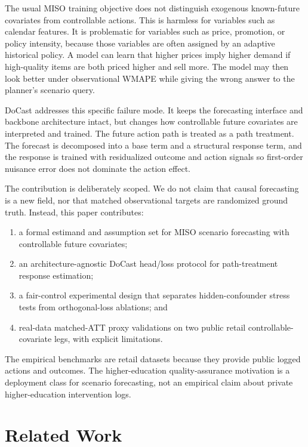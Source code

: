 \documentclass[11pt]{article}
\begin{document}
The usual MISO training objective does not distinguish exogenous known-future
covariates from controllable actions. This is harmless for variables such as
calendar features. It is problematic for variables such as price, promotion, or
policy intensity, because those variables are often assigned by an adaptive
historical policy. A model can learn that higher prices imply higher demand if
high-quality items are both priced higher and sell more. The model may then
look better under observational WMAPE while giving the wrong answer to the
planner's scenario query.

DoCast addresses this specific failure mode. It keeps the forecasting interface
and backbone architecture intact, but changes how controllable future
covariates are interpreted and trained. The future action path is treated as a
path treatment. The forecast is decomposed into a base term and a structural
response term, and the response is trained with residualized outcome and action
signals so first-order nuisance error does not dominate the action effect.

The contribution is deliberately scoped. We do not claim that causal
forecasting is a new field, nor that matched observational targets are
randomized ground truth. Instead, this paper contributes:
\begin{enumerate}[leftmargin=1.3em]
  \item a formal estimand and assumption set for MISO scenario forecasting with
  controllable future covariates;
  \item an architecture-agnostic DoCast head/loss protocol for path-treatment
  response estimation;
  \item a fair-control experimental design that separates hidden-confounder
  stress tests from orthogonal-loss ablations; and
  \item real-data matched-ATT proxy validations on two public retail
  controllable-covariate legs, with explicit limitations.
\end{enumerate}
The empirical benchmarks are retail datasets because they provide public logged
actions and outcomes. The higher-education quality-assurance motivation is a
deployment class for scenario forecasting, not an empirical claim about private
higher-education intervention logs.

\section{Related Work}
\end{document}
